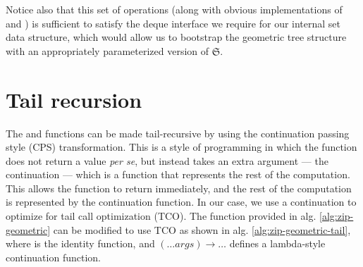 \documentclass{article}
\let\oldnl\nl%
\newcommand{\nonl}{\renewcommand{\nl}{\let\nl\oldnl}}%
\begin{document}
\begin{algorithm}[!htb]
    \caption{Basic operations on sequences using geometric trees}\label{alg:basic-sequence-ops}
    \DontPrintSemicolon

    \nonl\;
    \setcounter{AlgoLine}{0}
\end{algorithm}

Notice also that this set of operations (along with obvious implementations of \join and \split) is sufficient to satisfy the deque interface we require for our internal set data structure, which would allow us to bootstrap the geometric tree structure with an appropriately parameterized version of $\mathfrak{S}$.


\begin{algorithm}[!htb]
    \caption{Further operations on sequences using geometric trees}\label{alg:sequence-ops}
    \DontPrintSemicolon
    \nonl\;
    \setcounter{AlgoLine}{0}
    \nonl\;
    \setcounter{AlgoLine}{0}
    \nonl\;
    \setcounter{AlgoLine}{0}
\end{algorithm}

\section{Tail recursion}


The \zip and \unzip functions can be made tail-recursive by using the continuation passing style (CPS) transformation. This is a style of programming in which the function does not return a value \emph{per se}, but instead takes an extra argument --- the continuation --- which is a function that represents the rest of the computation. This allows the function to return immediately, and the rest of the computation is represented by the continuation function. In our case, we use a continuation to optimize for tail call optimization (TCO). The function provided in alg. \ref{alg:zip-geometric} can be modified to use TCO as shown in alg. \ref{alg:zip-geometric-tail}, where \id is the identity function, and $\left(\dots args \right) \rightarrow \dots$ defines a lambda-style continuation function.
\end{document}
